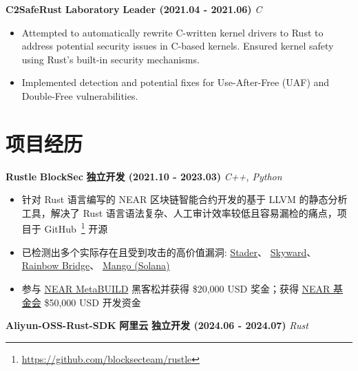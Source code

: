     \ifdefined\qr\else

        \noindent \textbf{C2SafeRust} \textbar{} \textbf{Laboratory} \textbar{} \textbf{Leader (2021.04 - 2021.06)} \hfill \textsl{C}

        \begin{itemize}
            \item Attempted to automatically rewrite C-written kernel drivers to Rust to address potential security issues in C-based kernels. Ensured kernel safety using Rust's built-in security mechanisms.
            \item Implemented detection and potential fixes for Use-After-Free (UAF) and Double-Free vulnerabilities.
        \end{itemize}

    \fi

\else

    \section*{项目经历}

    \noindent \textbf{Rustle} \textbar{} \textbf{BlockSec} \textbar{} \textbf{独立开发 (2021.10 - 2023.03)} \hfill \textsl{C++, Python}

    \begin{itemize}
        \item 针对 Rust 语言编写的 NEAR 区块链智能合约开发的基于 LLVM 的静态分析工具，解决了 Rust 语言语法复杂、人工审计效率较低且容易漏检的痛点，项目于 GitHub~\footnote{\url{https://github.com/blocksecteam/rustle}} 开源
        \item 已检测出多个实际存在且受到攻击的高价值漏洞:
              \href{https://blog.staderlabs.com/stader-near-incident-report-08-16-2022-afe077ffd549}{Stader}、
              \href{https://coinculture.com/au/business/skyward-finance-reportedly-suffers-3m-exploit-on-near-protocol/}{Skyward}、
              \href{https://cryptopotato.com/defi-crisis-averted-near-protocols-rainbow-bridge-attacker-loses-2-5-eth/}{Rainbow Bridge}、
              \href{https://blog.perp.fi/dissecting-the-mango-exploit-how-risk-is-mitigated-on-perp-v2-eccc91987c91}{Mango (Solana)}
        \item 参与 \href{https://devpost.com/software/rustle}{NEAR MetaBUILD} 黑客松并获得 \$20,000 USD 奖金；获得 \href{https://near.foundation}{NEAR 基金会} \$50,000 USD 开发资金
    \end{itemize}

    \noindent \textbf{Aliyun-OSS-Rust-SDK} \textbar{} \textbf{阿里云} \textbar{} \textbf{独立开发 (2024.06 - 2024.07)} \hfill \textsl{Rust}

